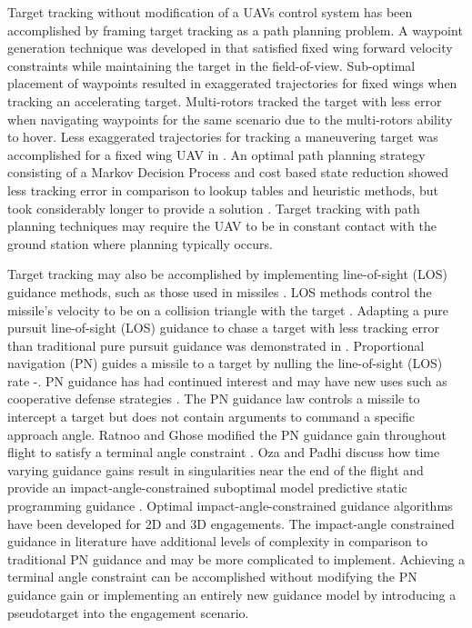\documentclass[conference]{IEEEtran}
\begin{document}
Target tracking without modification of a UAVs control system has been accomplished by framing target tracking as a path planning problem. A waypoint generation technique was developed in \cite{ariyur_autonomous_2008} that satisfied fixed wing forward velocity constraints while maintaining the target in the field-of-view. Sub-optimal placement of waypoints resulted in exaggerated trajectories for fixed wings when tracking an accelerating target. Multi-rotors tracked the target with less error when navigating waypoints for the same scenario due to the multi-rotors ability to hover. Less exaggerated trajectories for tracking a maneuvering target was accomplished for a fixed wing UAV in \cite{lee_strategies_2003}.  An optimal path planning strategy consisting of a Markov Decision Process and cost based state reduction showed less tracking error in comparison to lookup tables and heuristic methods, but took considerably longer to provide a solution \cite{baek_optimal_2013}. Target tracking with path planning techniques may require the UAV to be in constant contact with the ground station where planning typically occurs.  

Target tracking may also be accomplished by implementing line-of-sight (LOS) guidance methods, such as those used in missiles \cite{zarchan}. LOS methods control the missile’s velocity to be on a collision triangle with the target \cite{shneydor1998missile,yanushevsky2007modern}. Adapting a pure pursuit line-of-sight (LOS) guidance to chase a target with less tracking error than traditional pure pursuit guidance was demonstrated in \cite{yamasaki_advanced_2009}.  Proportional navigation (PN) guides a missile to a target by nulling the line-of-sight (LOS) rate \cite{shneydor1998missile}-\cite{yanushevsky2007modern}. PN guidance has had continued interest and may have new uses such as cooperative defense strategies \cite{isaac}. The PN guidance law controls a missile to intercept a target but does not contain arguments to command a specific approach angle. Ratnoo and Ghose modified the PN guidance gain throughout flight to satisfy a terminal angle constraint \cite{ratnoo2009satisfying}. Oza and Padhi discuss how time varying guidance gains result in singularities near the end of the flight and provide an impact-angle-constrained suboptimal model predictive static programming guidance \cite{oza2012impact}. Optimal impact-angle-constrained guidance algorithms have been developed for 2D \cite{park2013optimal} and 3D \cite{kumar2014three} engagements. The impact-angle constrained guidance in literature have additional levels of complexity in comparison to traditional PN guidance and may be more complicated to implement. Achieving a terminal angle constraint can be accomplished without modifying the PN guidance gain or implementing an entirely new guidance model by introducing a pseudotarget into the engagement scenario.
\end{document}
